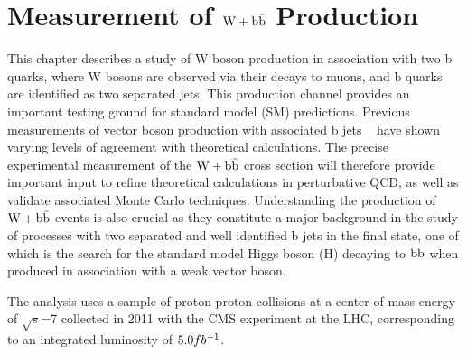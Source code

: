 \chapter{Measurement of $\mathrm{W+\mathrm{b\bar{b}}}$ Production}
This chapter describes a study of W boson production
in association with two b quarks, where W bosons are observed via their decays to muons, and
b quarks are identified as two separated jets.
This production channel provides an important testing ground for 
standard model (SM) predictions. 
Previous
measurements of vector boson production with associated b jets
~\cite{Aaltonen:2009qi,D0:2012qt,Aad:2011kp} have shown varying levels of agreement with theoretical 
calculations.
The precise experimental measurement of the $\mathrm{W+\mathrm{b\bar{b}}}$ cross section will therefore provide important
input to refine theoretical calculations in perturbative QCD, as well as validate associated Monte Carlo techniques.
Understanding the  production of $\mathrm{W+\mathrm{b\bar{b}}}$ events is also crucial as they constitute a major background in the
study of processes with two 
separated and well identified b jets in the final state, one of which is
the search for the standard model Higgs boson (H) decaying to $\mathrm{b\bar{b}}$
when produced in association with a weak vector boson.

The analysis uses a sample of proton-proton collisions 
at a center-of-mass energy of $\sqrt{s}$=7 \TeV collected in 2011 with the CMS experiment at the LHC, 
corresponding to an 
integrated luminosity of $5.0fb^\mathrm{-1}$.

